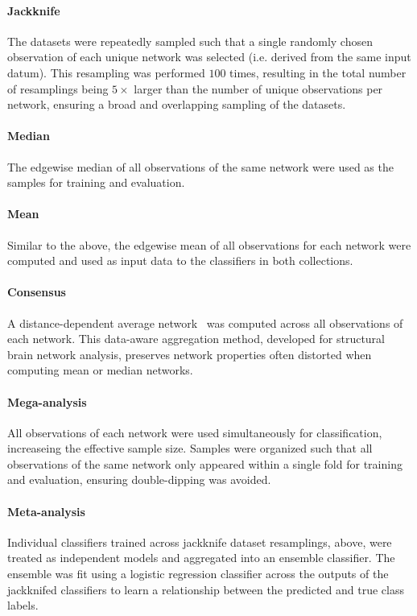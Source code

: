 \documentclass[10pt]{SelfArx} %
\begin{document}
\paragraph{Jackknife} The datasets were repeatedly sampled such that a single randomly chosen observation of each
unique network was selected (i.e. derived from the same input datum). This resampling was performed $100$ times,
resulting in the total number of resamplings being $5\times$ larger than the number of unique observations per network,
ensuring a broad and overlapping sampling of the datasets.

\paragraph{Median} The edgewise median of all observations of the same network were used as the samples for training
and evaluation.

\paragraph{Mean} Similar to the above, the edgewise mean of all observations for each network were computed and used
as input data to the classifiers in both collections.

\paragraph{Consensus} A distance-dependent average network~\cite{Betzel2018-eo} was computed across all observations
of each network. This data-aware aggregation method, developed for structural brain network analysis, preserves network
properties often distorted when computing mean or median networks.

\paragraph{Mega-analysis} All observations of each network were used simultaneously for classification, increaseing
the effective sample size. Samples were organized such that all observations of the same network only appeared within a
single fold for training and evaluation, ensuring double-dipping was avoided.

\paragraph{Meta-analysis} Individual classifiers trained across jackknife dataset resamplings, above, were treated as
independent models and aggregated into an ensemble classifier. The ensemble was fit using a logistic regression
classifier across the outputs of the jackknifed classifiers to learn a relationship between the predicted and true
class labels.
\end{document}
